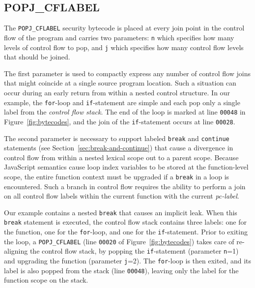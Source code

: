 \documentclass{llncs}
\begin{document}
\subsection{POPJ\_CFLABEL}

The \texttt{POPJ\_CFLABEL} security bytecode is placed at every join point in the control flow of the program and carries two parameters: \texttt{n} which specifies how many levels of control flow to pop, and \texttt{j} which specifies how many control flow levels that should be joined.

The first parameter is used to compactly express any number of control flow joins that might coincide at a single source program location.
Such a situation can occur during an early return from within a nested control structure.
In our example, the \texttt{for}-loop and \texttt{if}-statement are simple and each pop only a single label from the \textit{control flow stack}.
The end of the loop is marked at line \texttt{00048} in Figure~\ref{fig:bytecodes}, and the join of the \texttt{if}-statement occurs at line \texttt{00028}.

The second parameter is necessary to support labeled \texttt{break} and \texttt{continue} statements (see Section~\ref{sec:break-and-continue}) that cause a divergence in control flow from within a nested lexical scope out to a parent scope.
Because JavaScript semantics cause loop index variables to be stored at the function-level scope, the entire function context must be upgraded if a \texttt{break} in a loop is encountered.
Such a branch in control flow requires the ability to perform a join on all control flow labels within the current function with the current \textit{pc-label}.

Our example contains a nested \texttt{break} that causes an implicit leak.
When this \texttt{break} statement is executed, the control flow stack contains three labels: one for the function, one for the \texttt{for}-loop, and one for the \texttt{if}-statement.
Prior to exiting the loop, a \texttt{POPJ\_CFLABEL} (line \texttt{00020} of Figure~\ref{fig:bytecodes}) takes care of re-aligning the control flow stack, by popping the \texttt{if}-statement (parameter \texttt{n}=1) and upgrading the function (parameter \texttt{j}=2).
The \texttt{for}-loop is then exited, and its label is also popped from the stack (line \texttt{00048}), leaving only the label for the function scope on the stack.

\end{document}
